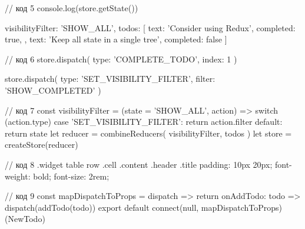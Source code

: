 // код 5
console.log(store.getState())

{
  visibilityFilter: 'SHOW_ALL',
  todos: [
    {
      text: 'Consider using Redux',
      completed: true,
    },
    {
      text: 'Keep all state in a single tree',
      completed: false
    }
  ]
}

// код 6
store.dispatch({
  type: 'COMPLETE_TODO',
  index: 1
})

store.dispatch({
  type: 'SET_VISIBILITY_FILTER',
  filter: 'SHOW_COMPLETED'
})

// код 7
const visibilityFilter = (state = 'SHOW\_ALL', action) => {
  switch (action.type) {
    case 'SET_VISIBILITY_FILTER':
      return action.filter
    default:
      return state
  }
}
let reducer = combineReducers({ visibilityFilter, todos })
let store = createStore(reducer)

// код 8
.widget table row .cell .content .header .title{ 
padding: 10px 20px; 
font-weight: bold; 
font-size: 2rem;
}

// код 9
const mapDispatchToProps = dispatch => {
  return {
    onAddTodo: todo => dispatch(addTodo(todo))
  }
}
export default connect(null, mapDispatchToProps)(NewTodo)